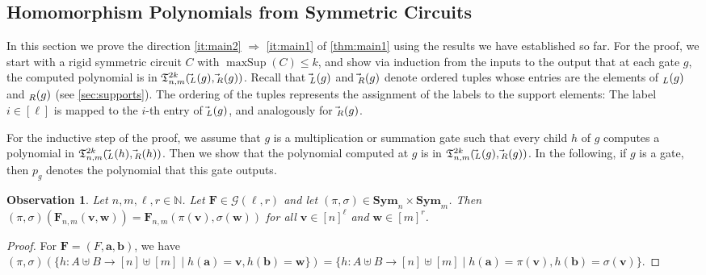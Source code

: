 \documentclass[11pt, DIV=15]{scrarticle}
\theoremstyle{definition}
\theoremstyle{plain}
\newtheorem{observation}[definition]{Observation}
\theoremstyle{remark}
\newcommand{\Sym}{\mathbf{Sym}}
\let\sup\relax
\DeclareMathOperator{\sup}{sup}
\DeclareMathOperator{\maxSup}{maxSup}
\begin{document}
 	\subsection{Homomorphism Polynomials from Symmetric Circuits}
 
 	In this section we prove the direction \ref{it:main2} $\Rightarrow$ \ref{it:main1} of \cref{thm:main1} using the results we have established so far. For the proof, we start with a rigid symmetric circuit $C$ with $\maxSup(C) \leq k$, and show via induction from the inputs to the output that at each gate $g$, the computed polynomial is in $\mathfrak{T}^{2k}_{n,m}(\vec{\sup}_L(g), \vec{\sup}_R(g))$.  
 	Recall that $\vec{\sup}_L(g)$ and $\vec{\sup}_R(g)$ denote ordered tuples whose entries are the elements of $\sup_L(g)$ and $\sup_R(g)$ (see \cref{sec:supports}). The ordering of the tuples represents the assignment of the labels to the support elements:
 	The label $i \in[\ell]$ is mapped to the $i$-th entry of $\vec{\sup}_L(g)$, and analogously for $\vec{\sup}_R(g)$. 
 	
 	For the inductive step of the proof, we assume that $g$ is a multiplication or summation gate such that every child $h$ of $g$ computes a polynomial in $\mathfrak{T}_{n,m}^{2k}(\vec{\sup}_L(h), \vec{\sup}_R(h))$. Then we show that the polynomial computed at $g$ is in $\mathfrak{T}_{n,m}^{2k}(\vec{\sup}_L(g), \vec{\sup}_R(g))$. In the following, if $g$ is a gate, then $p_g$ denotes the polynomial that this gate outputs.
  	
  	\begin{observation}\label{lem:labelsMovedByPermutations}
   		Let $n,m, \ell, r \in \mathbb{N}$.
  		Let $\boldsymbol{F} \in \mathcal{G}(\ell, r)$ and let $(\pi,\sigma) \in \Sym_n \times \Sym_m$. 
  		Then $(\pi, \sigma)(\boldsymbol{F}_{n,m}(\boldsymbol{v}, \boldsymbol{w})) = \boldsymbol{F}_{n,m}(\pi(\boldsymbol{v}), \sigma(\boldsymbol{w}))$ for all $\boldsymbol{v} \in [n]^\ell$ and $\boldsymbol{w} \in [m]^r$.
  	\end{observation}	
  	\begin{proof}
 		For $\boldsymbol{F} = (F, \boldsymbol{a}, \boldsymbol{b})$,
  		we have $(\pi,\sigma)( \{ h\colon A \uplus B \to [n] \uplus [m] \mid h(\boldsymbol{a}) = \boldsymbol{v}, h(\boldsymbol{b}) = \boldsymbol{w} \} ) =  \{ h\colon A \uplus B \to [n] \uplus [m] \mid h(\boldsymbol{a}) = \pi(\boldsymbol{v}) , h(\boldsymbol{b}) = \sigma(\boldsymbol{v}) \}$.
  	\end{proof}	
  	
\end{document}
